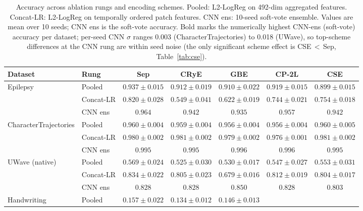 \documentclass[conference,compsoc]{IEEEtran}
\begin{document}
\begin{table}[t]
\caption{Accuracy across ablation rungs and encoding schemes.
Pooled: L2-LogReg on 492-dim aggregated features.
Concat-LR: L2-LogReg on temporally ordered patch features.
CNN ens: 10-seed soft-vote ensemble.
Values are mean over 10 seeds; CNN ens is the soft-vote accuracy.
Bold marks the numerically highest CNN-ens (soft-vote) accuracy per
dataset; per-seed CNN $\sigma$ ranges 0.003 (CharacterTrajectories) to
0.018 (UWave), so top-scheme differences at the CNN rung are within
seed noise (the only significant scheme effect is CSE\,$<$\,Sep,
Table~\ref{tab:cse}).}
\label{tab:ablation}
\centering
\setlength{\tabcolsep}{5pt}
\begin{tabular}{llccccc}
\toprule
Dataset & Rung & Sep & CRyE & GBE & CP-2L & CSE \\
\midrule
\multirow{3}{*}{Epilepsy}
  & Pooled    & $0.937 \pm 0.015$ & $0.912 \pm 0.019$ & $0.910 \pm 0.022$
               & $0.919 \pm 0.015$ & $0.899 \pm 0.015$ \\
  & Concat-LR & $0.820 \pm 0.028$ & $0.549 \pm 0.041$ & $0.622 \pm 0.019$
               & $0.744 \pm 0.021$ & $0.754 \pm 0.018$ \\
  & CNN ens   & $0.964$           & $0.942$           & $0.935$
               & $0.957$           & $0.942$           \\
\midrule
\multirow{3}{*}{CharacterTrajectories}
  & Pooled    & $0.960 \pm 0.004$ & $0.959 \pm 0.004$ & $0.956 \pm 0.004$
               & $0.956 \pm 0.004$ & $0.960 \pm 0.005$ \\
  & Concat-LR & $0.980 \pm 0.002$ & $0.981 \pm 0.002$ & $0.979 \pm 0.002$
               & $0.976 \pm 0.001$ & $0.981 \pm 0.002$ \\
  & CNN ens   & $0.995$           & $0.995$           & $\mathbf{0.996}$
               & $0.996$           & $0.995$           \\
\midrule
\multirow{3}{*}{UWave (native)}
  & Pooled    & $0.569 \pm 0.024$ & $0.525 \pm 0.030$ & $0.530 \pm 0.017$
               & $0.547 \pm 0.027$ & $0.553 \pm 0.031$ \\
  & Concat-LR & $0.834 \pm 0.022$ & $0.805 \pm 0.023$ & $0.679 \pm 0.016$
               & $0.812 \pm 0.019$ & $0.804 \pm 0.017$ \\
  & CNN ens   & $0.828$           & $0.828$           & $\mathbf{0.850}$
               & $0.828$           & $0.803$           \\
\midrule
\multirow{3}{*}{Handwriting}
  & Pooled    & $0.157 \pm 0.022$ & $0.134 \pm 0.012$ & $0.146 \pm 0.013$

\end{tabular}
\end{table}
\end{document}
